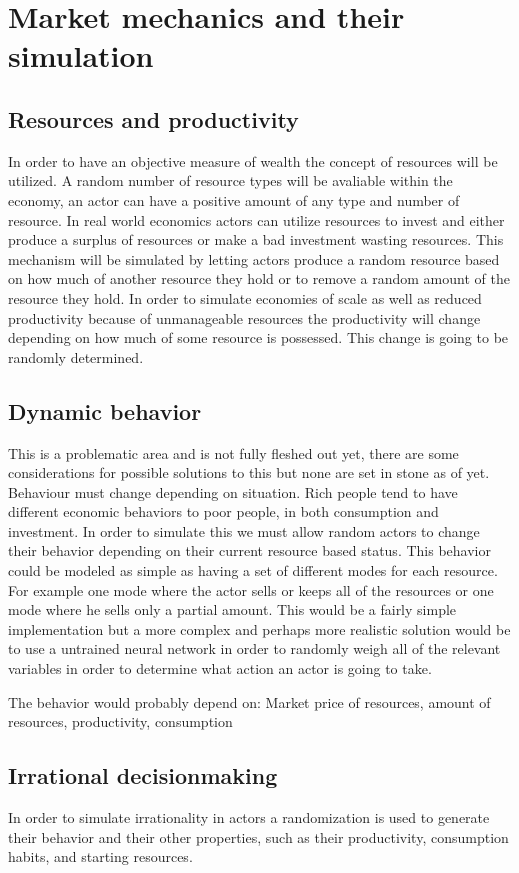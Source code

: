 \documentclass[11p]{article}
\begin{document}
\section{Market mechanics and their simulation}
\subsection{Resources and productivity}
In order to have an objective measure of wealth the concept of resources will be utilized. A random number of resource types will be avaliable within the economy, an actor can have a positive amount of any type and number of resource.
In real world economics actors can utilize resources to invest and either produce a surplus of resources or make a bad investment wasting resources. This mechanism will be simulated by letting actors produce a random resource based on how much of another resource they hold or to remove a random amount of the resource they hold.
In order to simulate economies of scale as well as reduced productivity because of unmanageable resources the productivity will change depending on how much of some resource is possessed. This change is going to be randomly determined.

\subsection{Dynamic behavior}
This is a problematic area and is not fully fleshed out yet, there are some considerations for possible solutions to this but none are set in stone as of yet.
Behaviour must change depending on situation. Rich people tend to have different economic behaviors to poor people, in both consumption and investment.
In order to simulate this we must allow random actors to change their behavior depending on their current resource based status. This behavior could be modeled as simple as having a set of different modes for each resource. For example one mode where the actor sells or keeps all of the resources or one mode where he sells only a partial amount. 
This would be a fairly simple implementation but a more complex and perhaps more realistic solution would be to use a untrained neural network in order to randomly weigh all of the relevant variables in order to determine what action an actor is going to take.

The behavior would probably depend on: Market price of resources, amount of resources, productivity, consumption
\subsection{Irrational decisionmaking}
In order to simulate irrationality in actors a randomization is used to generate their behavior and their other properties, such as their productivity, consumption habits, and starting resources.
\end{document}
